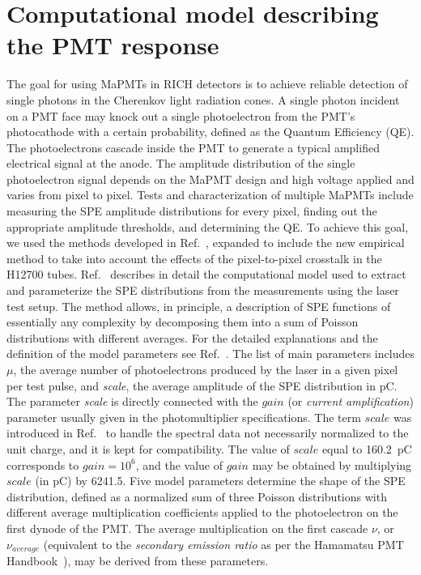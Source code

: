\section{Computational model describing the PMT response}

The goal for using MaPMTs in RICH detectors is to achieve reliable detection of single photons in the Cherenkov light radiation cones. A single photon incident on a PMT face may knock out a single photoelectron from the PMT's photocathode with a certain probability, defined as the Quantum Efficiency (QE). The photoelectrons cascade inside the PMT to generate a typical amplified electrical signal at the anode. The amplitude distribution of the single photoelectron signal depends on the MaPMT design and high voltage applied and varies from pixel to pixel. Tests and characterization of multiple MaPMTs include measuring the SPE amplitude distributions for every pixel, finding out the appropriate amplitude thresholds, and determining the QE. To achieve this goal, we used the methods developed in Ref.~\cite{DEGTIARENKO20171}, expanded to include the new empirical method to take into account the effects of the pixel-to-pixel crosstalk in the H12700 tubes. Ref.~\cite{DEGTIARENKO20171} describes in detail the computational model used to extract and parameterize the SPE distributions from the measurements using the laser test setup. The method allows, in principle, a description of SPE functions of essentially any complexity by decomposing them into a sum of Poisson distributions with different averages. For the detailed explanations and the definition of the model parameters see Ref.~\cite{DEGTIARENKO20171}. The list of main parameters includes $\mu$, the average number of photoelectrons produced by the laser in a given pixel per test pulse, and {\it{scale}}, the average amplitude of the SPE distribution in pC. 
The parameter {\it{scale}} is directly connected with the $gain$ (or {\it{current amplification}}) parameter usually given in the photomultiplier specifications. The term $scale$ was introduced in Ref.~\cite{DEGTIARENKO20171} to handle the spectral data not necessarily normalized to the unit charge, and it is kept for compatibility. The value of $scale$ equal to 160.2~pC corresponds to $gain=10^6$, and the value of $gain$ may be obtained by multiplying $scale$ (in pC) by 6241.5.
Five model parameters determine the shape of the SPE distribution, defined as a normalized sum of three Poisson distributions with different average multiplication coefficients  applied to the photoelectron on the first dynode of the PMT. The average multiplication on the first cascade ${\nu}$, or ${\nu_{average}}$ (equivalent to the {\it secondary emission ratio} as per the Hamamatsu PMT Handbook~\cite{Hamamatsu4thedition}), may be derived from these parameters. 
